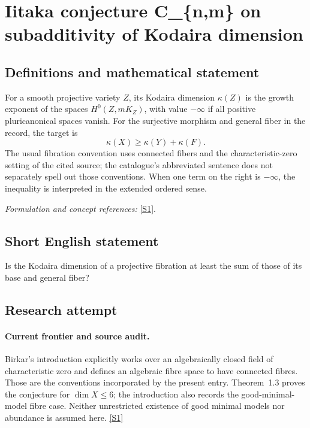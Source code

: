 \documentclass[11pt,a4paper]{article}
\newcommand{\sref}[2]{\hyperlink{source:#1:#2}{[S#2]}}
\newif\ifshowcatalogue
\newcommand{\cataloguescope}[1]{\ifshowcatalogue
 \paragraph{Exact scope in the supplied catalogue.}
 \begin{quote}\small #1\end{quote}\fi}
\numberwithin{equation}{section}
\begin{document}
\setcounter{section}{113}
\clearpage
\section{\texorpdfstring{Iitaka conjecture C\_\{n,m\} on subadditivity of Kodaira dimension}{Iitaka conjecture C\_\{n,m\} on subadditivity of Kodaira dimension}}\label{114}
\subsection{Definitions and mathematical statement}
For a smooth projective variety $Z$, its Kodaira dimension $\kappa(Z)$ is the growth exponent of the spaces $H^0(Z,mK_Z)$, with value $-\infty$ if all positive pluricanonical spaces vanish. For the surjective morphism and general fiber in the record, the target is
\[
 \kappa(X)\ge\kappa(Y)+\kappa(F).
\]
The usual fibration convention uses connected fibers and the characteristic-zero setting of the cited source; the catalogue's abbreviated sentence does not separately spell out those conventions. When one term on the right is $-\infty$, the inequality is interpreted in the extended ordered sense.
\par\smallskip\textit{Formulation and concept references:} \sref{114}{1}.
\cataloguescope{Prove the Iitaka conjecture C\_\{n,m\}: for a surjective morphism f: X -> Y between smooth projective varieties with general fibre F, kappa(X) >= kappa(Y) + kappa(F).}
\subsection{Short English statement}
Is the Kodaira dimension of a projective fibration at least the sum of those of its base and general fiber?
\subsection{Research attempt}

\paragraph{Current frontier and source audit.}
Birkar's introduction explicitly works over an algebraically closed field
of characteristic zero and defines an algebraic fibre space to have
connected fibres. Those are the conventions incorporated by the present
entry. Theorem~1.3 proves the conjecture for $\dim X\leq6$; the introduction
also records the good-minimal-model fibre case. Neither unrestricted
existence of good minimal models nor abundance is assumed here.
\sref{114}{1}
\end{document}
